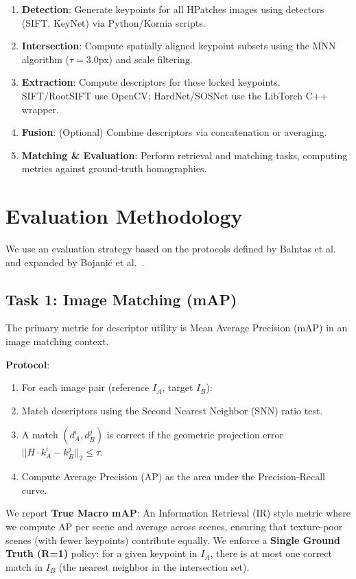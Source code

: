 \begin{enumerate}
    \item \textbf{Detection}: Generate keypoints for all HPatches images using detectors (SIFT, KeyNet) via Python/Kornia scripts.
    \item \textbf{Intersection}: Compute spatially aligned keypoint subsets using the MNN algorithm ($\tau=3.0$px) and scale filtering.
    \item \textbf{Extraction}: Compute descriptors for these locked keypoints. SIFT/RootSIFT use OpenCV; HardNet/SOSNet use the LibTorch C++ wrapper.
    \item \textbf{Fusion}: (Optional) Combine descriptors via concatenation or averaging.
    \item \textbf{Matching \& Evaluation}: Perform retrieval and matching tasks, computing metrics against ground-truth homographies.
\end{enumerate}

\section{Evaluation Methodology}

We use an evaluation strategy based on the protocols defined by Balntas et al.~\cite{balntas2017hpatches} and expanded by Bojani\'{c} et al.~\cite{bojanic2020comparison}.

\subsection{Task 1: Image Matching (mAP)}

The primary metric for descriptor utility is Mean Average Precision (mAP) in an image matching context.

\textbf{Protocol}:
\begin{enumerate}
    \item For each image pair (reference $I_A$, target $I_B$):
    \item Match descriptors using the Second Nearest Neighbor (SNN) ratio test.
    \item A match $(d_A^i, d_B^j)$ is correct if the geometric projection error $||H \cdot k_A^i - k_B^j||_2 \leq \tau$.
    \item Compute Average Precision (AP) as the area under the Precision-Recall curve.
\end{enumerate}

We report \textbf{True Macro mAP}: An Information Retrieval (IR) style metric where we compute AP per scene and average across scenes, ensuring that texture-poor scenes (with fewer keypoints) contribute equally. We enforce a \textbf{Single Ground Truth (R=1)} policy: for a given keypoint in $I_A$, there is at most one correct match in $I_B$ (the nearest neighbor in the intersection set).

